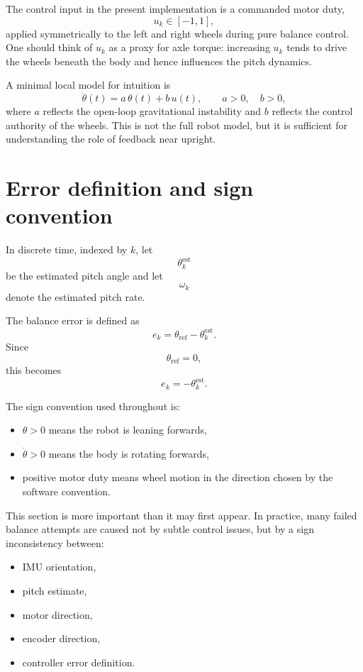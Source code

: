 \documentclass[11pt,a4paper]{article}
\begin{document}
The control input in the present implementation is a commanded motor duty,
\[
u_k \in [-1,1],
\]
applied symmetrically to the left and right wheels during pure balance control. One should think of \(u_k\) as a proxy for axle torque: increasing \(u_k\) tends to drive the wheels beneath the body and hence influences the pitch dynamics.

A minimal local model for intuition is
\[
\ddot{\theta}(t) = a\,\theta(t) + b\,u(t),
\qquad a>0,\quad b>0,
\]
where \(a\) reflects the open-loop gravitational instability and \(b\) reflects the control authority of the wheels. This is not the full robot model, but it is sufficient for understanding the role of feedback near upright.

\section{Error definition and sign convention}

In discrete time, indexed by \(k\), let
\[
\theta^{\mathrm{est}}_k
\]
be the estimated pitch angle and let
\[
\omega_k
\]
denote the estimated pitch rate.

The balance error is defined as
\[
e_k = \theta_{\mathrm{ref}} - \theta^{\mathrm{est}}_k.
\]
Since
\[
\theta_{\mathrm{ref}} = 0,
\]
this becomes
\[
e_k = -\theta^{\mathrm{est}}_k.
\]

The sign convention used throughout is:
\begin{itemize}
    \item \( \theta > 0 \) means the robot is leaning forwards,
    \item \( \dot{\theta} > 0 \) means the body is rotating forwards,
    \item positive motor duty means wheel motion in the direction chosen by the software convention.
\end{itemize}

This section is more important than it may first appear. In practice, many failed balance attempts are caused not by subtle control issues, but by a sign inconsistency between:
\begin{itemize}
    \item IMU orientation,
    \item pitch estimate,
    \item motor direction,
    \item encoder direction,
    \item controller error definition.
\end{itemize}
\end{document}
